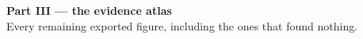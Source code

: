 \documentclass[aspectratio=169,11pt]{beamer}
\begin{document}
%
%
\begin{frame}[plain]
  \vfill
  \begin{center}
    {\color{gicnavy}\Large\bfseries Part III --- the evidence atlas}\\[0.8em]
    {\color{gicgrey}\footnotesize Every remaining exported figure, including
     the ones that found nothing.}
  \end{center}
  \vfill
\end{frame}
\end{document}
